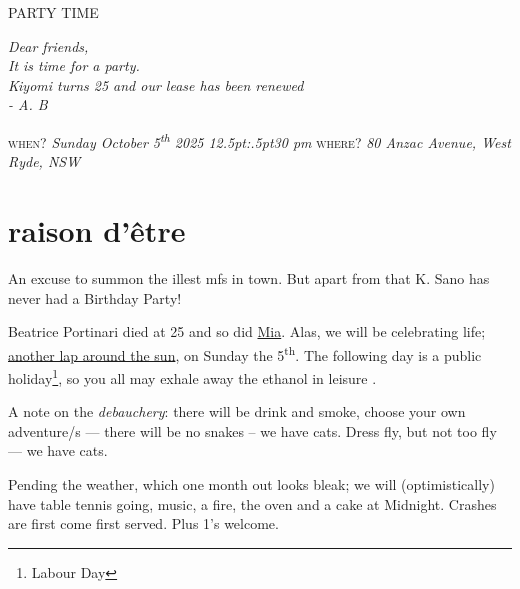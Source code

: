 \documentclass[dvipsnames]{article}
\begin{document}
%
\obeylines%
{ PARTY TIME}

\bigbreak
\textit{%
    Dear friends,\\


    It is time for a party. \\



    Kiyomi turns 25 and our lease has been renewed \\


    - A. B
}

\bigskip

{\scshape when?}
\textit{%
  Sunday October 5\/\rlap{,}\textsuperscript{th} 2025
  12\kern.5pt:\kern.5pt30 pm
}
\medbreak
{\scshape where?}
\textit{%
  80 Anzac Avenue,
  West Ryde,
  NSW
}

\newpage
\enlargethispage{1cm}
\section*{raison d'être}

An excuse to summon the illest mfs in town. But apart from that K. Sano has never had a Birthday Party!

Beatrice Portinari died at 25 and so did \href{https://abaj.ai/blog/mia/}{Mia}. Alas, we will be celebrating life; \href{https://frizzande.io/articles/thirty_three/}{another lap around the sun}, on Sunday the 5\textsuperscript{th}. The following day is a public holiday\footnote{Labour Day}, so you all may exhale away the ethanol in leisure .

A note on the \emph{debauchery}: there will be drink and smoke, choose your own adventure/s --- there will be no snakes -- we have cats. Dress fly, but not too fly --- we have cats.

Pending the weather, which one month out looks bleak; we will (optimistically) have table tennis going, music, a fire, the oven and a cake at Midnight. Crashes are first come first served. Plus 1's welcome.
\end{document}
